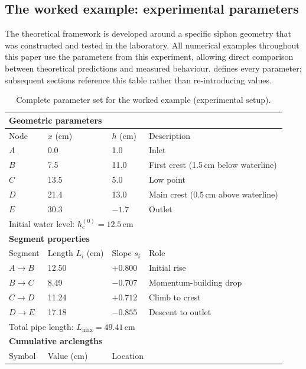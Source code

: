 \documentclass[11pt]{article}
\begin{document}
\subsection{The worked example: experimental parameters}
\label{sec:worked-example}

The theoretical framework is developed around a specific siphon geometry that was constructed and tested in the laboratory. All numerical examples throughout this paper use the parameters from this experiment, allowing direct comparison between theoretical predictions and measured behaviour.  defines every parameter; subsequent sections reference this table rather than re-introducing values.

\begin{table}[H]
\centering
\caption{Complete parameter set for the worked example (experimental setup).}
\label{tab:parameters}
\renewcommand{\arraystretch}{1.2}
\small
\begin{tabular}{llll}
\toprule
\multicolumn{4}{l}{\textbf{Geometric parameters}} \\
\midrule
Node & $x$ (cm) & $h$ (cm) & Description \\
\midrule
$A$ & 0.0 & 1.0 & Inlet \\
$B$ & 7.5 & 11.0 & First crest (1.5\,cm below waterline) \\
$C$ & 13.5 & 5.0 & Low point \\
$D$ & 21.4 & 13.0 & Main crest (0.5\,cm above waterline) \\
$E$ & 30.3 & $-1.7$ & Outlet \\
\midrule
\multicolumn{4}{l}{Initial water level: $h_c^{(0)} = 12.5$\,cm} \\
\midrule
\multicolumn{4}{l}{\textbf{Segment properties}} \\
\midrule
Segment & Length $L_i$ (cm) & Slope $s_i$ & Role \\
\midrule
$A \to B$ & 12.50 & $+0.800$ & Initial rise \\
$B \to C$ & 8.49 & $-0.707$ & Momentum-building drop \\
$C \to D$ & 11.24 & $+0.712$ & Climb to crest \\
$D \to E$ & 17.18 & $-0.855$ & Descent to outlet \\
\midrule
\multicolumn{4}{l}{Total pipe length: $L_{\max} = 49.41$\,cm} \\
\midrule
\multicolumn{4}{l}{\textbf{Cumulative arclengths}} \\
\midrule
Symbol & Value (cm) & \multicolumn{2}{l}{Location} \\

\end{tabular}
\end{table}
\end{document}

